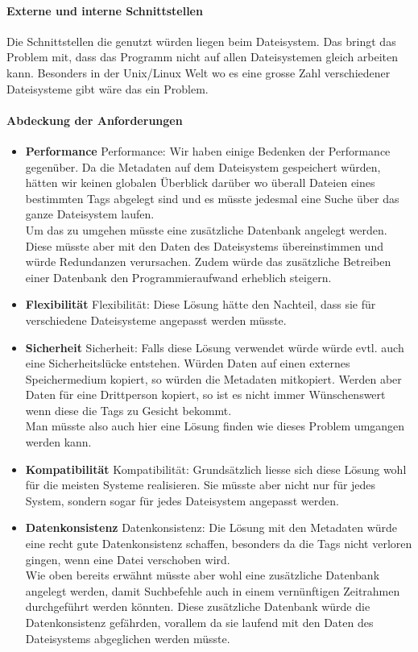 \documentclass[10pt,paper=a4,final]{scrartcl}
\begin{document}
\paragraph{Externe und interne Schnittstellen}
Die Schnittstellen die genutzt würden liegen beim Dateisystem. Das bringt das Problem mit, dass das Programm nicht auf allen Dateisystemen gleich arbeiten kann. Besonders in der Unix/Linux Welt wo es eine grosse Zahl verschiedener Dateisysteme gibt wäre das ein Problem.
\paragraph{Abdeckung der Anforderungen}
\begin{itemize}
  \item {\bf Performance} Performance: Wir haben einige Bedenken der Performance gegenüber. Da die Metadaten auf dem Dateisystem gespeichert würden, hätten wir keinen globalen Überblick darüber wo überall Dateien eines bestimmten Tags abgelegt sind und es müsste jedesmal eine Suche über das ganze Dateisystem laufen.\\
  Um das zu umgehen müsste eine zusätzliche Datenbank angelegt werden. Diese müsste aber mit den Daten des Dateisystems übereinstimmen und würde Redundanzen verursachen. Zudem würde das zusätzliche Betreiben einer Datenbank den Programmieraufwand erheblich steigern.
  \item {\bf Flexibilität} Flexibilität: Diese Lösung hätte den Nachteil, dass sie für verschiedene Dateisysteme angepasst werden müsste. 
  \item {\bf Sicherheit} Sicherheit: Falls diese Lösung verwendet würde würde evtl. auch eine Sicherheitslücke entstehen. Würden Daten auf einen externes Speichermedium kopiert, so würden die Metadaten mitkopiert. Werden aber Daten für eine Drittperson kopiert, so ist es nicht immer Wünschenswert wenn diese die Tags zu Gesicht bekommt.\\
  Man müsste also auch hier eine Lösung finden wie dieses Problem umgangen werden kann.
  \item {\bf Kompatibilit\"at} Kompatibilität: Grundsätzlich liesse sich diese Lösung wohl für die meisten Systeme realisieren. Sie müsste aber nicht nur für jedes System, sondern sogar für jedes Dateisystem angepasst werden.
  \item {\bf Datenkonsistenz} Datenkonsistenz: Die Lösung mit den Metadaten würde eine recht gute Datenkonsistenz schaffen, besonders da die Tags nicht verloren gingen, wenn eine Datei verschoben wird.\\
  Wie oben bereits erwähnt müsste aber wohl eine zusätzliche Datenbank angelegt werden, damit Suchbefehle auch in einem vernünftigen Zeitrahmen durchgeführt werden könnten. Diese zusätzliche Datenbank würde die Datenkonsistenz gefährden, vorallem da sie laufend mit den Daten des Dateisystems abgeglichen werden müsste.
\end{itemize}
\end{document}
